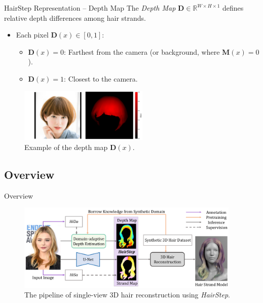 \begin{frame}[t]{HairStep Representation -- Depth Map}
    The \emph{Depth Map} $\mathbf{D} \in \mathbb{R}^{W \times H \times 1}$ defines
    relative depth differences among hair strands.

    \begin{itemize}
        \item Each pixel $\mathbf{D}(x) \in [0, 1]$:
        \begin{itemize}
            \item $\mathbf{D}(x) = 0$: Farthest from the camera (or background, where $\mathbf{M}(x)=0$).
            \item $\mathbf{D}(x) = 1$: Closest to the camera.
        \end{itemize}
    \end{itemize}  %

    \begin{figure}[t]
        \centering
        \includegraphics[width=0.55\textwidth]{assets/figures/method/depth-map/depth-map.png}
        \caption{Example of the depth map $\mathbf{D}(x)$.}
        \label{fig:depth_map_example}
    \end{figure}
\end{frame}

\subsection{Overview}

\begin{frame}{Overview}
    \begin{figure}[t]
        \centering
        \includegraphics[width=0.95\textwidth]{assets/figures/method/overview.png}
        \caption{The pipeline of single-view 3D hair reconstruction using \textit{HairStep}.}
        \label{fig:overview}
    \end{figure}
\end{frame}

